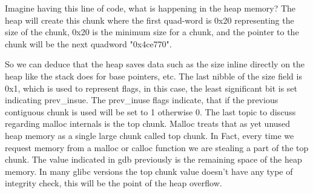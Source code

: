     Imagine having this line of code, what is happening in the heap memory?\newline
    The heap will create this chunk where the first quad-word is 0x20 representing the size of the chunk, 0x20 is the minimum size for a chunk, and the pointer to the chunk will be the next quadword "0x4ce770".\newline

    So we can deduce that the heap saves data such as the size inline directly on the heap like the stack does for base pointers, etc.\newline
    The last nibble of the size field is 0x1, which is used to represent flags, in this case, the least significant bit is set indicating prev\_insue.\newline
    The prev\_inuse flags indicate, that if the previous contiguous chunk is used will be set to 1 otherwise 0. \newline
    The last topic to discuss regarding malloc internals is the top chunk.\newline
    Malloc treats that as yet unused heap memory as a single large chunk called top chunk.\newline
    In Fact, every time we request memory from a malloc or calloc function we are stealing a part of the top chunk.\newline
    The value indicated in gdb previously is the remaining space of the heap memory.\newline
    In many glibc versions the top chunk value doesn't have any type of integrity check, this will be the point of the heap overflow.\newline

    
